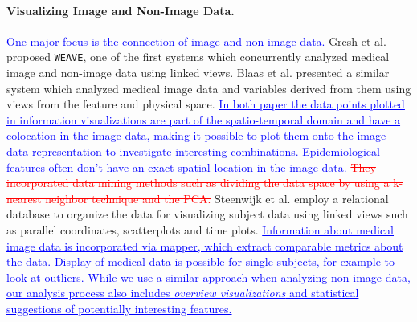 \documentclass[journal]{style/vgtc} 			          %
\newcommand{\rem}[1]{\textcolor{red}{\sout{#1}}}
\newcommand{\add}[1]{\textcolor{blue}{\uline{#1}}}
\begin{document}
\paragraph{Visualizing Image and Non-Image Data.}
\add{One major focus is the connection of image and non-image data.}
Gresh et al. \cite{Gresh2000} proposed \texttt{WEAVE}, one of the first systems which concurrently analyzed medical image and non-image data using linked views.
%
%
Blaas et al. \cite{Blaas2007} presented a similar system which analyzed medical image data and variables derived from them using views from the feature and physical space.
\add{In both paper the data points plotted in information visualizations are part of the spatio-temporal domain and have a colocation in the image data, making it possible to plot them onto the image data representation to investigate interesting combinations.
%
Epidemiological features often don't have an exact spatial location in the image data.}
%
\rem{They incorporated data mining methods such as dividing the data space by using a k-nearest neighbor technique and the PCA.}
%
Steenwijk et al. \cite{Steenwijk2010} employ a relational database to organize the data for visualizing subject data using linked views such as parallel coordinates, scatterplots and time plots.
%
\add{Information about medical image data is incorporated via mapper, which extract comparable metrics about the data.
%
Display of medical data is possible for single subjects, for example to look at outliers.
%
While we use a similar approach when analyzing non-image data, our analysis process also includes \emph{overview visualizations} and statistical suggestions of potentially interesting features.}
\end{document}
